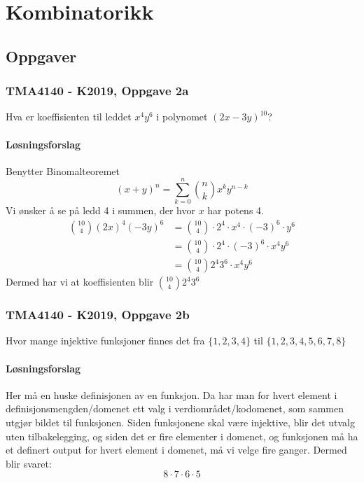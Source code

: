 \section{Kombinatorikk}


\subsection{Oppgaver}
\subsubsection{TMA4140 - K2019, Oppgave 2a}
Hva er koeffisienten til leddet $x^4 y^6$ i polynomet $(2x-3y)^{10}$?

\paragraph*{Løsningsforslag}

Benytter Binomalteoremet
\[
(x+y)^n=\sum_{k=0}^{n}\binom{n}{k} x^k y^{n-k}
\]
Vi ønsker å se på ledd 4 i summen, der hvor $x$ har potens 4.
\begin{align}
    \binom{10}{4}(2x)^4(-3y)^6 &= \binom{10}{4}\cdot 2^4 \cdot x^4 \cdot (-3)^6 \cdot y^6\\
    &= \binom{10}{4}\cdot 2^4 \cdot (-3)^6 \cdot x^4 y^6\\
    &= \binom{10}{4} 2^4 3^6 \cdot x^4 y^6
\end{align}
Dermed har vi at koeffisienten blir $\binom{10}{4} 2^4 3^6 $

\subsubsection{TMA4140 - K2019, Oppgave 2b}
Hvor mange injektive funksjoner finnes det fra $\{1,2,3,4\}$ til $\{1,2,3,4,5,6,7,8\}$

\paragraph*{Løsningsforslag} 

Her må en huske definisjonen av en funksjon. Da har man for hvert element i definisjonsmengden/domenet 
ett valg i verdiområdet/kodomenet, som sammen utgjør bildet til funksjonen. Siden funksjonene skal være
injektive, blir det utvalg uten tilbakelegging, og siden det er fire elementer i domenet, og funksjonen
må ha et definert output for hvert element i domenet, må vi velge fire ganger. Dermed blir svaret:
\[
8\cdot 7 \cdot 6\cdot 5   
\]